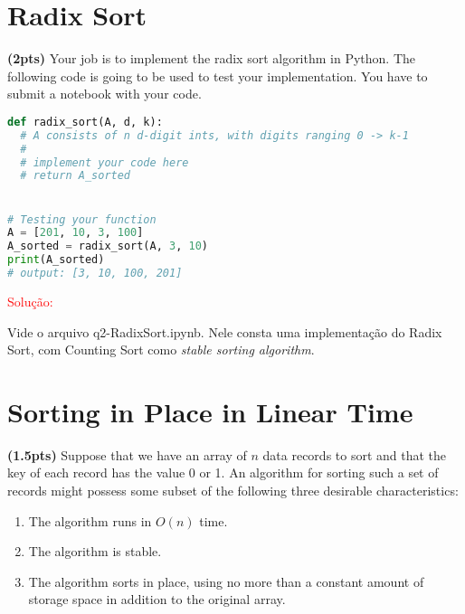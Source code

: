 \documentclass{article}
\begin{document}
\vspace{\baselineskip}

\section{Radix Sort}

\textbf{(2pts) }Your job is to implement the radix sort algorithm in Python. The following code is going to be used to test your implementation. You have to submit a notebook with your code. 
 
 \newpage
 
\begin{lstlisting}[language=Python]
def radix_sort(A, d, k):
  # A consists of n d-digit ints, with digits ranging 0 -> k-1
  #
  # implement your code here
  # return A_sorted


# Testing your function
A = [201, 10, 3, 100]
A_sorted = radix_sort(A, 3, 10)
print(A_sorted)
# output: [3, 10, 100, 201]
\end{lstlisting}

\vspace{\baselineskip}

\textcolor{red}{Solução: }

\vspace{\baselineskip}

Vide o arquivo q2-RadixSort.ipynb. Nele consta uma implementação do Radix Sort, com Counting Sort como \textit{stable sorting algorithm}.

\vspace{\baselineskip}

\section{Sorting in Place in Linear Time}
\textbf{(1.5pts)} Suppose that we have an array of $n$ data records to sort and that the key of each record has the value 0 or 1. An algorithm for sorting such a set of records might possess some subset of the following three desirable characteristics:

\begin{enumerate}
  \item The algorithm runs in $O(n)$ time.
  \item The algorithm is stable.
  \item The algorithm sorts in place, using no more than a constant amount of storage space in addition to the original array.
\end{enumerate}
\end{document}
